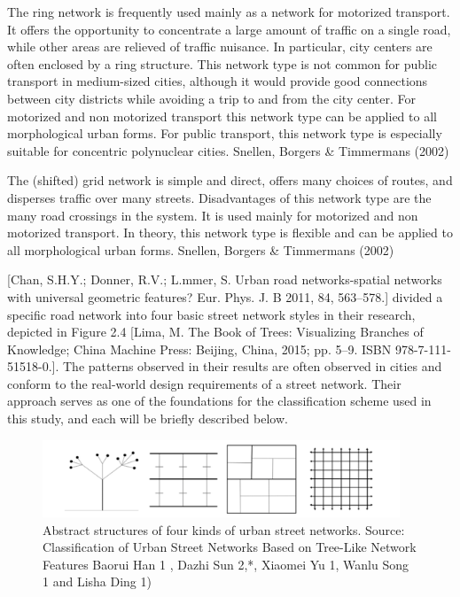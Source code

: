 The ring network is frequently used mainly as a network for motorized transport. It offers the opportunity to concentrate a large amount of traffic on a single road, while other areas are relieved of traffic nuisance. In particular, city centers are often enclosed by a ring structure. This network type is not common for public transport in medium-sized cities, although it would provide good connections between city districts while avoiding a trip to and from the city center. For motorized and non motorized transport this network type can be applied to all morphological urban forms. For public transport, this network type is especially suitable for concentric polynuclear cities. Snellen, Borgers \& Timmermans (2002)

The (shifted) grid network is simple and direct, offers many choices of routes, and disperses traffic over many streets. Disadvantages of this network type are the many road crossings in the system. It is used mainly for motorized and non motorized transport. In theory, this network type is flexible and can be applied to all morphological urban forms. Snellen, Borgers \& Timmermans (2002)

[Chan, S.H.Y.; Donner, R.V.; L.mmer, S. Urban road networks-spatial networks with universal geometric features? Eur. Phys. J. B 2011, 84, 563–578.] divided a specific road network into four basic street network styles in their research, depicted in Figure 2.4 [Lima, M. The Book of Trees: Visualizing Branches of Knowledge; China Machine Press: Beijing, China, 2015; pp. 5–9. ISBN 978-7-111-51518-0.].  The patterns observed in their results are often observed in cities and conform to the real-world design requirements of a street network. Their approach serves as one of the foundations for the classification scheme used in this study, and each will be briefly described below.

\begin{figure}[h]
\centering
\includegraphics[width=0.95\textwidth,center]{picture/figure4.png}
\caption[Miniaturtrichter]{Abstract structures of four kinds of urban street networks. Source: Classification of Urban Street Networks Based on Tree-Like Network Features Baorui Han 1 , Dazhi Sun 2,*, Xiaomei Yu 1, Wanlu Song 1 and Lisha Ding 1)}
\label{fig:transportnetworks}
\end{figure}

